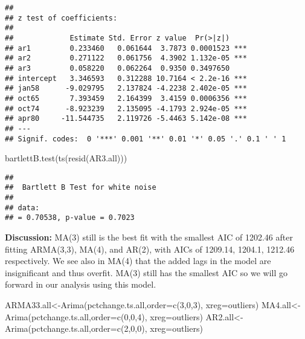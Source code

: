 \documentclass[
]{article}
\newenvironment{Shaded}{\begin{snugshade}}{\end{snugshade}}
\newcommand{\AttributeTok}[1]{\textcolor[rgb]{0.77,0.63,0.00}{#1}}
\newcommand{\DecValTok}[1]{\textcolor[rgb]{0.00,0.00,0.81}{#1}}
\newcommand{\FunctionTok}[1]{\textcolor[rgb]{0.00,0.00,0.00}{#1}}
\newcommand{\NormalTok}[1]{#1}
\newcommand{\OtherTok}[1]{\textcolor[rgb]{0.56,0.35,0.01}{#1}}
\begin{document}
\begin{verbatim}
## 
## z test of coefficients:
## 
##             Estimate Std. Error z value  Pr(>|z|)    
## ar1         0.233460   0.061644  3.7873 0.0001523 ***
## ar2         0.271122   0.061756  4.3902 1.132e-05 ***
## ar3         0.058220   0.062264  0.9350 0.3497650    
## intercept   3.346593   0.312288 10.7164 < 2.2e-16 ***
## jan58      -9.029795   2.137824 -4.2238 2.402e-05 ***
## oct65       7.393459   2.164399  3.4159 0.0006356 ***
## oct74      -8.923239   2.135095 -4.1793 2.924e-05 ***
## apr80     -11.544735   2.119726 -5.4463 5.142e-08 ***
## ---
## Signif. codes:  0 '***' 0.001 '**' 0.01 '*' 0.05 '.' 0.1 ' ' 1
\end{verbatim}

\begin{Shaded}
\begin{Highlighting}[]
\FunctionTok{bartlettB.test}\NormalTok{(}\FunctionTok{ts}\NormalTok{(}\FunctionTok{resid}\NormalTok{(AR3.all)))}
\end{Highlighting}
\end{Shaded}

\begin{verbatim}
## 
##  Bartlett B Test for white noise
## 
## data:  
## = 0.70538, p-value = 0.7023
\end{verbatim}

\textbf{Discussion:} MA(3) still is the best fit with the smallest AIC
of 1202.46 after fitting ARMA(3,3), MA(4), and AR(2), with AICs of
1209.14, 1204.1, 1212.46 respectively. We see also in MA(4) that the
added lags in the model are insignificant and thus overfit. MA(3) still
has the smallest AIC so we will go forward in our analysis using this
model.

\begin{Shaded}
\begin{Highlighting}[]
\NormalTok{ARMA33.all}\OtherTok{\textless{}{-}}\FunctionTok{Arima}\NormalTok{(pctchange.ts.all,}\AttributeTok{order=}\FunctionTok{c}\NormalTok{(}\DecValTok{3}\NormalTok{,}\DecValTok{0}\NormalTok{,}\DecValTok{3}\NormalTok{), }\AttributeTok{xreg=}\NormalTok{outliers)}
\NormalTok{MA4.all}\OtherTok{\textless{}{-}}\FunctionTok{Arima}\NormalTok{(pctchange.ts.all,}\AttributeTok{order=}\FunctionTok{c}\NormalTok{(}\DecValTok{0}\NormalTok{,}\DecValTok{0}\NormalTok{,}\DecValTok{4}\NormalTok{), }\AttributeTok{xreg=}\NormalTok{outliers)}
\NormalTok{AR2.all}\OtherTok{\textless{}{-}}\FunctionTok{Arima}\NormalTok{(pctchange.ts.all,}\AttributeTok{order=}\FunctionTok{c}\NormalTok{(}\DecValTok{2}\NormalTok{,}\DecValTok{0}\NormalTok{,}\DecValTok{0}\NormalTok{), }\AttributeTok{xreg=}\NormalTok{outliers)}
\end{Highlighting}
\end{Shaded}
\end{document}

